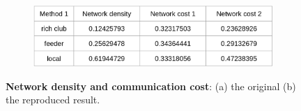 \documentclass{article}
\begin{document}
\begin{figure}[!htp]
{\begin{subfigure}[b]{0.2\textwidth}
            \caption{}
            \label{fig:fig2-2-orig}
        \end{subfigure}\\
        \begin{subfigure}[b]{0.6\textwidth}
            \centering
            \includegraphics[width=\textwidth]{table3}
            \caption{}
            \label{fig:table3}
        \end{subfigure}
    }
    \caption{\textbf{Network density and communication cost}: (a) the original (b) the reproduced result.}
    \label{fig:fig2-2}
\end{figure}
\end{document}
